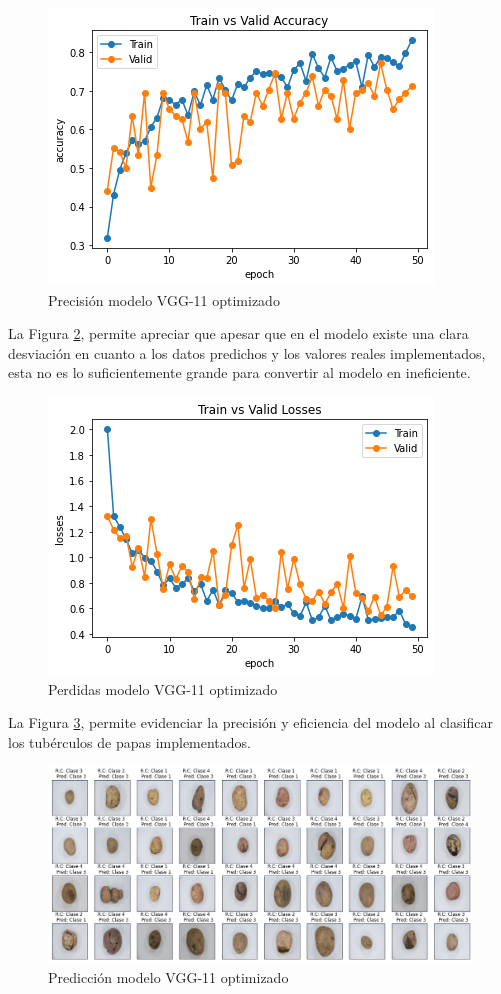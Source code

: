 		\begin{figure}[ht]
			\centering
			\includegraphics[scale=0.6]{Figs/508.png}
			\caption{Precisión modelo VGG-11 optimizado}
			\label{fig:preci_vgg11_OPT}
		\end{figure}
	
	La Figura \ref{fig:perdda_vgg11_opt}, permite apreciar que apesar que en el modelo existe una clara desviación en cuanto a los datos predichos y los valores reales implementados, esta no es lo suficientemente grande para convertir al modelo en ineficiente.
		\begin{figure}[ht]
			\centering
			\includegraphics[scale=0.6]{Figs/509.png}
			\caption{Perdidas modelo VGG-11 optimizado}
			\label{fig:perdda_vgg11_opt}
		\end{figure}
	
	
	La Figura \ref{fig:pre_vgg11_opt}, permite evidenciar la precisión y eficiencia del modelo al clasificar los tubérculos de papas implementados. 	
		\begin{figure}[ht]
			\centering
			\includegraphics[scale=0.4]{Figs/510.png}
			\caption{Predicción modelo VGG-11 optimizado}
			\label{fig:pre_vgg11_opt}
		\end{figure}
	

